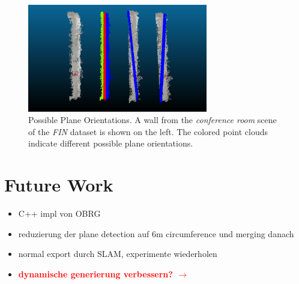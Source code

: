 \documentclass[main.tex]{subfiles}
\begin{document}
\begin{figure}
    \centering
    \includegraphics[width=0.7\textwidth]{images/possible_planes.png}
    \caption[Possible Plane Orientations]{Possible Plane Orientations. A wall from the \textit{conference room} scene of the \textit{FIN} dataset is shown on the left. The colored point clouds indicate different possible plane orientations.}
    \label{fig:poss-planes}
\end{figure}
\section{Future Work}

\begin{itemize}
    \item C++ impl von OBRG
    \item reduzierung der plane detection auf 6m circumference und merging danach
    \item normal export durch SLAM, experimente wiederholen
    \item \textbf{\textcolor{red}{dynamische generierung verbessern? $\rightarrow$ }}
\end{itemize}
\end{document}
